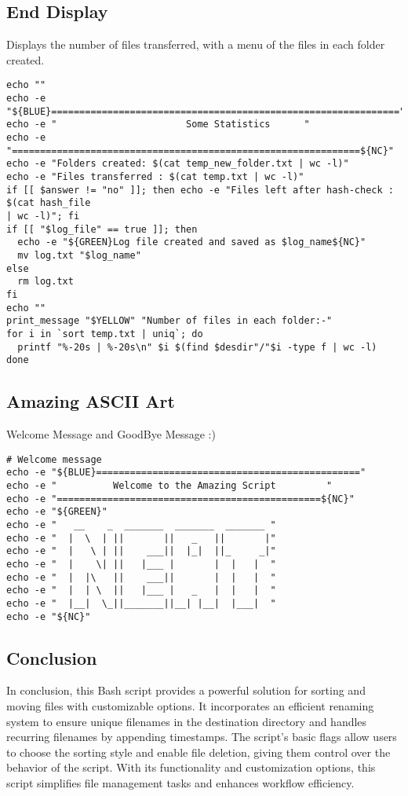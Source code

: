 \documentclass{article}
\begin{document}
\subsection {End Display}
Displays the number of files transferred, with a menu of the files in each folder created.
  \begin{verbatim}
echo ""
echo -e "${BLUE}=============================================================="
echo -e "                       Some Statistics      "
echo -e "==============================================================${NC}"
echo -e "Folders created: $(cat temp_new_folder.txt | wc -l)"
echo -e "Files transferred : $(cat temp.txt | wc -l)"
if [[ $answer != "no" ]]; then echo -e "Files left after hash-check : $(cat hash_file
| wc -l)"; fi
if [[ "$log_file" == true ]]; then
  echo -e "${GREEN}Log file created and saved as $log_name${NC}"
  mv log.txt "$log_name"
else
  rm log.txt
fi
echo ""
print_message "$YELLOW" "Number of files in each folder:-"
for i in `sort temp.txt | uniq`; do
  printf "%-20s | %-20s\n" $i $(find $desdir"/"$i -type f | wc -l)
done
  \end{verbatim}
\subsection{Amazing ASCII Art} Welcome Message and GoodBye Message :)
    \begin{verbatim}
# Welcome message
echo -e "${BLUE}==============================================="
echo -e "          Welcome to the Amazing Script         "
echo -e "===============================================${NC}"
echo -e "${GREEN}"
echo -e "   __    _  _______  _______  _______ "
echo -e "  |  \  | ||       ||   _   ||       |"
echo -e "  |   \ | ||    ___||  |_|  ||_     _|"
echo -e "  |    \| ||   |___ |       |  |   |  "
echo -e "  |  |\   ||    ___||       |  |   |  "
echo -e "  |  | \  ||   |___ |   _   |  |   |  "
echo -e "  |__|  \_||_______||__| |__|  |___|  "
echo -e "${NC}"

  \end{verbatim}
\subsection{Conclusion}
In conclusion, this Bash script provides a powerful solution for sorting and moving files with customizable options. It incorporates an efficient renaming system to ensure unique filenames in the destination directory and handles recurring filenames by appending timestamps. The script's basic flags allow users to choose the sorting style and enable file deletion, giving them control over the behavior of the script. With its functionality and customization options, this script simplifies file management tasks and enhances workflow efficiency.
\end{document}
